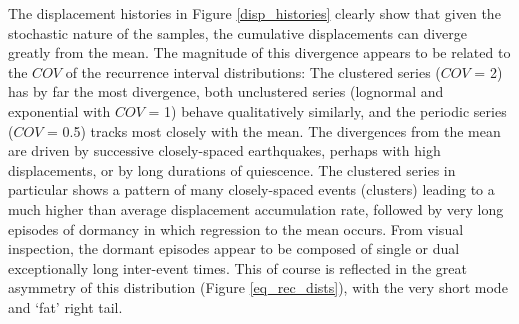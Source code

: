 \documentclass[se, manuscript]{copernicus}
\begin{document}
The displacement histories in Figure \ref{disp_histories} clearly show
that given the stochastic nature of the samples, the cumulative
displacements can diverge greatly from the mean. The magnitude of this
divergence appears to be related to the \(COV\) of the recurrence
interval distributions: The clustered series (\(COV\) = 2) has by far
the most divergence, both unclustered series (lognormal and exponential
with \(COV\) = 1) behave qualitatively similarly, and the periodic
series (\(COV\) = 0.5) tracks most closely with the mean. The
divergences from the mean are driven by successive closely-spaced
earthquakes, perhaps with high displacements, or by long durations of
quiescence. The clustered series in particular shows a pattern of many
closely-spaced events (clusters) leading to a much higher than average
displacement accumulation rate, followed by very long episodes of
dormancy in which regression to the mean occurs. From visual inspection,
the dormant episodes appear to be composed of single or dual
exceptionally long inter-event times. This of course is reflected in the
great asymmetry of this distribution (Figure \ref{eq_rec_dists}), with
the very short mode and `fat' right tail.
\end{document}
